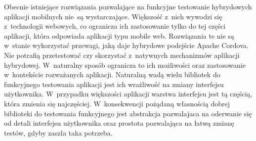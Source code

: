 \documentclass{xmgr}
\begin{document}
Obecnie istniejące rozwiązania pozwalające na funkcyjne testowanie hybrydowych aplikacji mobilnych nie~są wystarczające. Większość z~nich wywodzi się z~technologii webowych, co ogranicza ich zastosowanie tylko do tej części aplikacji, która odpowiada aplikacji typu mobile web. Rozwiązania te nie są w~stanie wykorzystać przewagi, jaką daje hybrydowe podejście Apache Cordova. Nie potrafią przetestować czy skorzystać z~natywnych mechanizmów aplikacji hybrydowej. W~naturalny sposób ogranicza to ich możliwości oraz zastosowanie w~kontekście rozważanych aplikacji. Naturalną wadą wielu bibliotek do funkcyjnego testowania aplikacji jest ich wrażliwość na zmiany interfejsu użytkownika. W~przypadku większości aplikacji warstwa interfejsu jest tą częścią, która zmienia się najczęściej. W~konsekwencji pożądaną własnością dobrej biblioteki do testowania funkcyjnego jest abstrakcja pozwalajaca na oderwanie się od detali interfejsu użytkownika oraz prostota pozwalająca na łatwą zmianę testów, gdyby zaszła taka potrzeba. 
\end{document}
